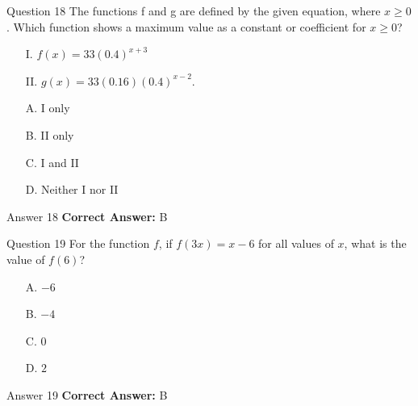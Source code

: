 \documentclass{beamer}
\begin{document}
\begin{frame}{Question 18}
\small
The functions f and g are defined by the given equation, where \(\displaystyle  x \geq0\). Which function shows a maximum value as a constant or coefficient for \(\displaystyle x \geq 0\)?

\begin{enumerate}
    \item[I.] \(\displaystyle f(x) = 33(0.4)^{x + 3}\)
    \item[II.] \(\displaystyle g(x) = 33(0.16)(0.4)^{x - 2}\).
\end{enumerate}
\vspace{0.35cm}
\begin{enumerate}
    \item[A.] I only
    \item[B.] II only
    \item[C.] I and II
    \item[D.] Neither I nor II
\end{enumerate}

\end{frame}
\begin{frame}{Answer 18}
\small
\textbf{Correct Answer:} B
\end{frame}

\begin{frame}{Question 19}
\small
For the function \( f \), if \( f(3x) = x - 6 \) for all values of \( x \), what is the value of \( f(6) \)?
\vspace{0.35cm}
\begin{enumerate}
    \item[A.] \(\displaystyle -6\)
    \item[B.] \(\displaystyle -4\)
    \item[C.] \(\displaystyle 0\)
    \item[D.] \(\displaystyle 2\)
\end{enumerate}

\end{frame}
\begin{frame}{Answer 19}
\small
\textbf{Correct Answer:} B
\end{frame}
\end{document}
